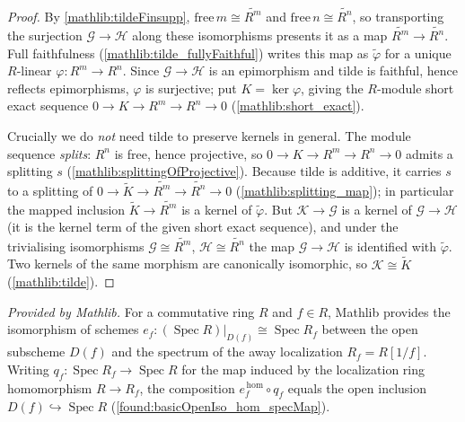 \begin{proof}
  \leanok
  By \cref{mathlib:tildeFinsupp}, \(\mathrm{free}\,m\cong\widetilde{R^m}\) and
  \(\mathrm{free}\,n\cong\widetilde{R^n}\), so transporting the surjection
  \(\mathcal G\to\mathcal H\) along these isomorphisms presents it as a map
  \(\widetilde{R^m}\to\widetilde{R^n}\).  Full faithfulness
  (\cref{mathlib:tilde_fullyFaithful}) writes this map as \(\widetilde\varphi\) for a
  unique \(R\)-linear \(\varphi:R^m\to R^n\).  Since \(\mathcal G\to\mathcal H\) is an
  epimorphism and \(\mathrm{tilde}\) is faithful, hence reflects epimorphisms,
  \(\varphi\) is surjective; put \(K=\ker\varphi\), giving the \(R\)-module short
  exact sequence \(0\to K\to R^m\to R^n\to 0\) (\cref{mathlib:short_exact}).

  Crucially we do \emph{not} need \(\mathrm{tilde}\) to preserve kernels in general.
  The module sequence \emph{splits}: \(R^n\) is free, hence projective, so
  \(0\to K\to R^m\to R^n\to 0\) admits a splitting \(s\)
  (\cref{mathlib:splittingOfProjective}).  Because \(\mathrm{tilde}\) is additive,
  it carries \(s\) to a splitting of \(0\to\widetilde K\to\widetilde{R^m}\to
  \widetilde{R^n}\to 0\) (\cref{mathlib:splitting_map}); in particular the mapped
  inclusion \(\widetilde K\to\widetilde{R^m}\) is a kernel of \(\widetilde\varphi\).
  But \(\mathcal K\to\mathcal G\) is a kernel of \(\mathcal G\to\mathcal H\) (it is
  the kernel term of the given short exact sequence), and under the trivialising
  isomorphisms \(\mathcal G\cong\widetilde{R^m}\), \(\mathcal H\cong\widetilde{R^n}\)
  the map \(\mathcal G\to\mathcal H\) is identified with \(\widetilde\varphi\).  Two
  kernels of the same morphism are canonically isomorphic, so
  \(\mathcal K\cong\widetilde K\) (\cref{mathlib:tilde}).
\end{proof}


\begin{lemma}
  \label{mathlib:basicOpenIsoSpecAway}
  \mathlibok
  \textit{Provided by Mathlib.}
  For a commutative ring \(R\) and \(f\in R\), Mathlib provides the isomorphism of
  schemes \(e_f:(\operatorname{Spec}R)|_{D(f)}\cong\operatorname{Spec}R_f\) between the
  open subscheme \(D(f)\) and the spectrum of the away localization
  \(R_f=R[1/f]\).  Writing \(q_f:\operatorname{Spec}R_f\to\operatorname{Spec}R\) for
  the map induced by the localization ring homomorphism \(R\to R_f\), the composition
  \(e_f^{\,\mathrm{hom}}\circ q_f\) equals the open inclusion
  \(D(f)\hookrightarrow\operatorname{Spec}R\) (\cref{found:basicOpenIso_hom_specMap}).
\end{lemma}

